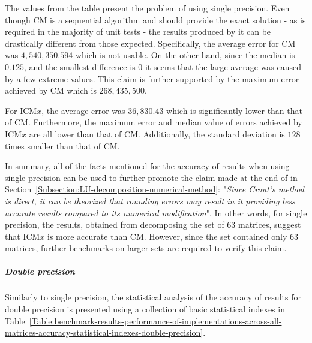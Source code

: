 The values from the table present the problem of using single precision. Even though CM is a sequential algorithm and should provide the exact solution - as is required in the majority of unit tests - the results produced by it can be drastically different from those expected. Specifically, the average error for CM was $ 4,540,350.594 $ which is not usable. On the other hand, since the median is $ 0.125 $, and the smallest difference is $ 0 $ it seems that the large average was caused by a few extreme values. This claim is further supported by the maximum error achieved by CM which is $ 268,435,500 $.
\par For ICM$ x $, the average error was $ 36,830.43 $ which is significantly lower than that of CM. Furthermore, the maximum error and median value of errors achieved by ICM$ x $ are all lower than that of CM. Additionally, the standard deviation is $ 128 $ times smaller than that of CM.
\par In summary, all of the facts mentioned for the accuracy of results when using single precision can be used to further promote the claim made at the end of \textit{} in Section~\ref{Subsection:LU-decomposition-numerical-method}: "\textit{Since Crout's method is direct, it can be theorized that rounding errors may result in it providing less accurate results compared to its numerical modification}". In other words, for single precision, the results, obtained from decomposing the set of $ 63 $ matrices, suggest that ICM$ x $ is more accurate than CM. However, since the set contained only $ 63 $ matrices, further benchmarks on larger sets are required to verify this claim.

\subparagraph{Double precision} Similarly to single precision, the statistical analysis of the accuracy of results for double precision is presented using a collection of basic statistical indexes in Table~\ref{Table:benchmark-results-performance-of-implementations-across-all-matrices-accuracy-statistical-indexes-double-precision}.

